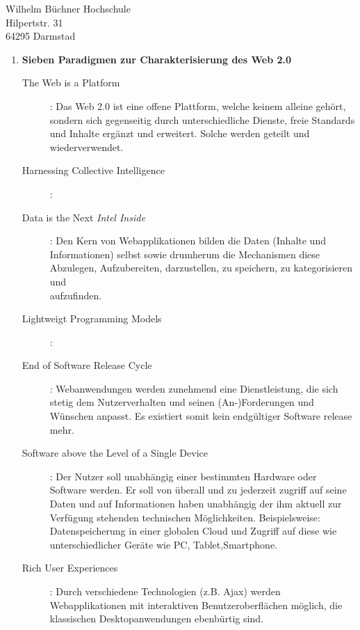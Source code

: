 \documentclass[
    version=last,           %
    DIV=13,                 %
    BCOR=0mm,               %
    paper=a4,               %
    fontsize=12pt,          %
    firsthead=on,           %
    firstfoot=on,           %
    pagenumber=on,i         %
    parskip=half,           %
    enlargefirstpage=,      %
    firsthead=on,           %
    fromrule=afteraddress,  %
    priority=off,           %
    backaddress=true,       %
    refline=dateright,      %
	fromalign=right,	    %
    fromemail=on,i          %
    fromurl=on,             %
    frombank=on,
    fromphone=on,           %
    frommobilephone=on      %
    fromlogo=on,            %
    addrfield=on,           %
    subject=untitled,  %
    foldmarks=off,          %
    numericaldate=off,      %
	pagenumber=right,	        %
	parskip=half,	        %
    headsep=false,          %
    footsepline=true,       %
    foldmarks=off,		    %
	]{scrlttr2}
\begin{document}
\begin{letter} {Wilhelm Büchner Hochschule \\
Hilpertstr. 31\\
64295 Darmstad}
\begin{itemize}
\begin{enumerate}
            \vspace{1cm}
        \item \textbf{Sieben Paradigmen zur Charakterisierung des Web 2.0}
            \begin{description}
                \item[The Web is a Platform]:
                    Das Web 2.0 ist eine offene Plattform, welche keinem alleine
                    gehört, sondern sich gegenseitig durch unterschiedliche
                    Dienste, freie Standards und Inhalte ergänzt und erweitert.
                    Solche werden geteilt und wiederverwendet.
                \item[Harnessing Collective Intelligence]:
                \item[Data is the Next \textit{Intel Inside}]:
                    Den Kern von Webapplikationen bilden die Daten (Inhalte und
                    Informationen) selbst sowie drumherum die Mechanismen diese
                    Abzulegen, Aufzubereiten, darzustellen, zu speichern, zu
                    kategorisieren und \\ aufzufinden.
                \item[Lightweigt Programming Models]:
                \item[End of Software Release Cycle]:
                    Webanwendungen werden zunehmend eine Dienstleistung, die
                    sich stetig dem Nutzerverhalten und seinen (An-)Forderungen
                    und Wünschen anpasst. Es existiert somit kein endgültiger
                    Software release mehr.
                \item[Software above the Level of a Single Device]:
                    Der Nutzer soll unabhängig einer bestimmten Hardware oder
                    Software werden. Er soll von überall und zu jederzeit
                    zugriff auf seine Daten und auf Informationen haben
                    unabhängig der ihm aktuell zur Verfügung stehenden
                    technischen Möglichkeiten. Beispielsweise: Datenspeicherung
                    in einer globalen Cloud und Zugriff auf diese wie
                    unterschiedlicher Geräte wie PC, Tablet,Smartphone.
                \item[Rich User Experiences]:
                    Durch verschiedene Technologien (z.B. Ajax) werden
                    Webapplikationen mit interaktiven Benutzeroberflächen
                    möglich, die klassischen Desktopanwendungen ebenbürtig sind.
            \end{description}



\end{enumerate}
\end{itemize}
\end{letter}
\end{document}
